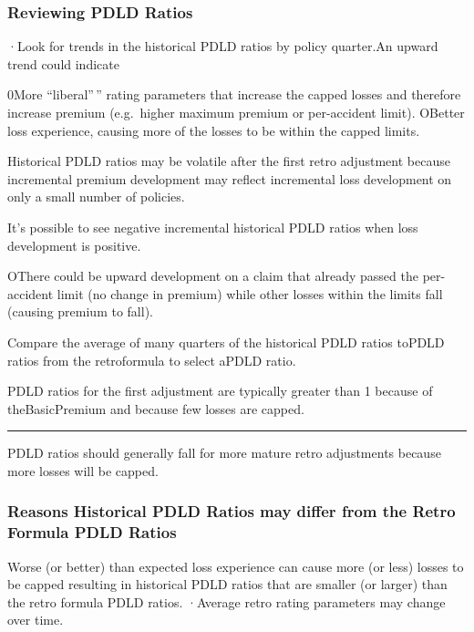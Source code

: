\documentclass[
]{article}
\begin{document}
\subsubsection{Reviewing PDLD Ratios}\label{reviewing-pdld-ratios}

·Look for trends in the historical PDLD ratios by policy quarter.An
upward trend could indicate

0More ``liberal''\,'' rating parameters that increase the capped losses
and therefore increase premium (e.g.~higher maximum premium or
per-accident limit). OBetter loss experience, causing more of the losses
to be within the capped limits.

Historical PDLD ratios may be volatile after the first retro adjustment
because incremental premium development may reflect incremental loss
development on only a small number of policies.

It's possible to see negative incremental historical PDLD ratios when
loss development is positive.

OThere could be upward development on a claim that already passed the
per-accident limit (no change in premium) while other losses within the
limits fall (causing premium to fall).

Compare the average of many quarters of the historical PDLD ratios
toPDLD ratios from the retroformula to select aPDLD ratio.

PDLD ratios for the first adjustment are typically greater than 1
because of theBasicPremium and because few losses are capped.

\begin{center}\rule{0.5\linewidth}{0.5pt}\end{center}

PDLD ratios should generally fall for more mature retro adjustments
because more losses will be capped.

\subsubsection{Reasons Historical PDLD Ratios may differ from the Retro
Formula PDLD
Ratios}\label{reasons-historical-pdld-ratios-may-differ-from-the-retro-formula-pdld-ratios}

Worse (or better) than expected loss experience can cause more (or less)
losses to be capped resulting in historical PDLD ratios that are smaller
(or larger) than the retro formula PDLD ratios. ·Average retro rating
parameters may change over time.
\end{document}
